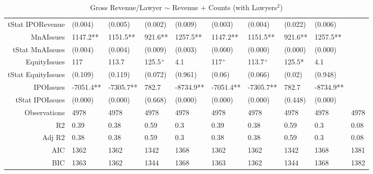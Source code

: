 \begin{table}[ht]
\begin{tabular}{rlllllllll}
  tStat IPORevenue & (0.004) & (0.005) & (0.002) & (0.009) & (0.003) & (0.004) & (0.022) & (0.006) &  \\ 
  MnAIssues & 1147.2** & 1151.5** & 921.6** & 1257.5** & 1147.2** & 1151.5** & 921.6** & 1257.5** &  \\ 
  tStat MnAIssues & (0.004) & (0.004) & (0.009) & (0.003) & (0.000) & (0.000) & (0.000) & (0.000) &  \\ 
  EquityIssues & 117 & 113.7 & 125.5$^{+}$ & 4.1 & 117$^{+}$ & 113.7$^{+}$ & 125.5* & 4.1 &  \\ 
  tStat EquityIssues & (0.109) & (0.119) & (0.072) & (0.961) & (0.06) & (0.066) & (0.02) & (0.948) &  \\ 
  IPOIssues & -7051.4** & -7305.7** & 782.7 & -8734.9** & -7051.4** & -7305.7** & 782.7 & -8734.9** &  \\ 
  tStat IPOIssues & (0.000) & (0.000) & (0.668) & (0.000) & (0.000) & (0.000) & (0.448) & (0.000) &  \\ 
  Observations & 4978 & 4978 & 4978 & 4978 & 4978 & 4978 & 4978 & 4978 & 4978 \\ 
  R2 & 0.39 & 0.38 & 0.59 & 0.3 & 0.39 & 0.38 & 0.59 & 0.3 & 0.08 \\ 
  Adj R2 & 0.38 & 0.38 & 0.59 & 0.3 & 0.38 & 0.38 & 0.59 & 0.3 & 0.08 \\ 
  AIC & 1362 & 1362 & 1342 & 1368 & 1362 & 1362 & 1342 & 1368 & 1381 \\ 
  BIC & 1363 & 1362 & 1344 & 1368 & 1363 & 1362 & 1344 & 1368 & 1382 \\ 
   \hline
\end{tabular}
\caption{Gross Revenue/Lawyer $\sim$ Revenue + Counts (with Lawyers$^2$)} 
\end{table}
